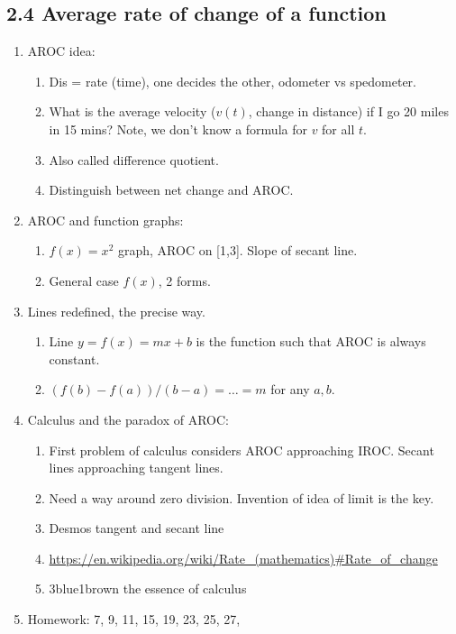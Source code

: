 \documentclass{article}
\begin{document}
\subsection{2.4 Average rate of change of a function}

\begin{enumerate}

\item AROC idea:
\begin{enumerate}
\item Dis = rate (time), one decides the other, odometer vs spedometer.
\item What is the average velocity ($v(t)$, change in distance) if I go 20 miles in 15 mins? Note, we don’t know a formula for $v$ for all $t$. 
\item Also called difference quotient.
\item Distinguish between net change and AROC.
\end{enumerate}

\item AROC and function graphs:
\begin{enumerate}
\item $f(x) = x^2$ graph, AROC on [1,3]. Slope of secant line.
\item General case $f(x)$, 2 forms. 
\end{enumerate}

\item Lines redefined, the precise way.
\begin{enumerate}
\item Line $y=f(x) = mx+b$ is the function such that AROC is always constant.
\item $(f(b)-f(a))/(b-a)= \dots = m$ for any $a,b$.
\end{enumerate}

\item Calculus and the paradox of AROC:
\begin{enumerate}
\item First problem of calculus considers AROC approaching IROC. Secant lines approaching tangent lines. 
\item Need a way around zero division. Invention of idea of limit is the key.
\item Desmos tangent and secant line
\item \url{https://en.wikipedia.org/wiki/Rate_(mathematics)#Rate_of_change}
\item 3blue1brown the essence of calculus
\end{enumerate}

\item Homework: 7, 9, 11, 15, 19, 23, 25, 27, 

\end{enumerate}
\end{document}
